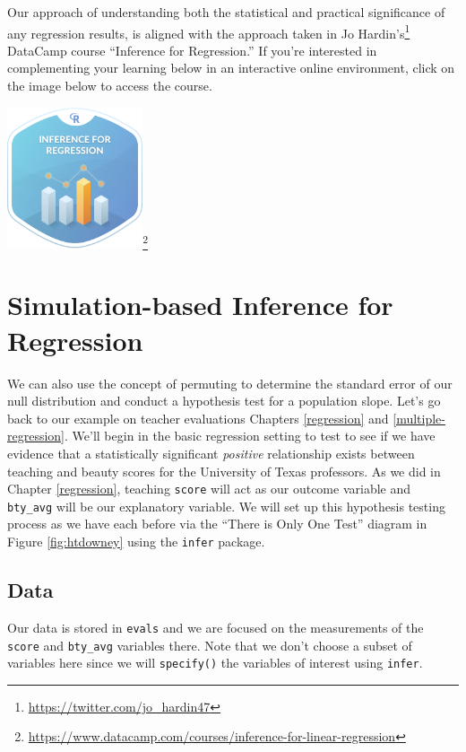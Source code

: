 \documentclass[12pt,]{krantz}
\renewcommand{\href}[2]{#2\footnote{\url{#1}}}
\theoremstyle{definition}
\theoremstyle{definition}
\theoremstyle{definition}
\theoremstyle{remark}
\begin{document}
Our approach of understanding both the statistical and practical
significance of any regression results, is aligned with the approach
taken in \href{https://twitter.com/jo_hardin47}{Jo Hardin's} DataCamp
course ``Inference for Regression.'' If you're interested in
complementing your learning below in an interactive online environment,
click on the image below to access the course.

\begin{center}
\href{https://www.datacamp.com/courses/inference-for-linear-regression}{\includegraphics[width=0.3\textwidth]{images/datacamp_inference_for_regression.png}}
\end{center}

\section{Simulation-based Inference for
Regression}\label{simulation-based-inference-for-regression}

We can also use the concept of permuting to determine the standard error
of our null distribution and conduct a hypothesis test for a population
slope. Let's go back to our example on teacher evaluations Chapters
\ref{regression} and \ref{multiple-regression}. We'll begin in the basic
regression setting to test to see if we have evidence that a
statistically significant \emph{positive} relationship exists between
teaching and beauty scores for the University of Texas professors. As we
did in Chapter \ref{regression}, teaching \texttt{score} will act as our
outcome variable and \texttt{bty\_avg} will be our explanatory variable.
We will set up this hypothesis testing process as we have each before
via the ``There is Only One Test'' diagram in Figure \ref{fig:htdowney}
using the \texttt{infer} package.

\subsection{Data}\label{data-1}

Our data is stored in \texttt{evals} and we are focused on the
measurements of the \texttt{score} and \texttt{bty\_avg} variables
there. Note that we don't choose a subset of variables here since we
will \texttt{specify()} the variables of interest using \texttt{infer}.
\end{document}
